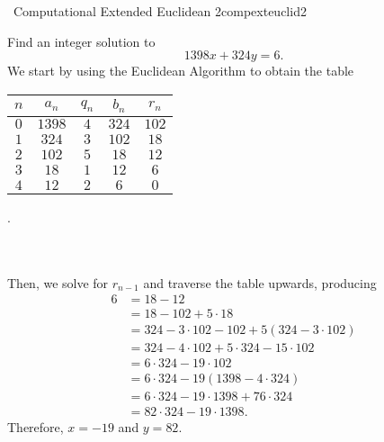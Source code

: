     \begin{exercise}{\Difficulty\,\Difficulty\,\,Computational Extended Euclidean 2}{compexteuclid2}
    
        Find an integer solution to
        \begin{equation*}
            1398x+324y=6.
        \end{equation*}
        We start by using the Euclidean Algorithm to obtain the table
        \begin{center}
            \begin{tabular}{c|c|c|c|c}
                \hline
                \(n\) & \(a_n\) & \(q_n\) & \(b_n\) & \(r_n\) \\
                \hline
                \(0\) & \(1398\) & \(4\) & \(324\) & \(102\) \\
                \(1\) & \(324\) & \(3\) & \(102\) & \(18\) \\
                \(2\) & \(102\) & \(5\) & \(18\) & \(12\) \\
                \(3\) & \(18\) & \(1\) & \(12\) & \(6\) \\
                \(4\) & \(12\) & \(2\) & \(6\) & \(0\) \\
                \hline
            \end{tabular}.
        \end{center}
        \vphantom
        \\
        \\
        Then, we solve for \(r_{n-1}\) and traverse the table upwards, producing
        \begin{align*}
            6&=18-12 \\
            &=18-102+5\cdot18 \\
            &=324-3\cdot102-102+5(324-3\cdot102) \\
            &=324-4\cdot102+5\cdot324-15\cdot102 \\
            &=6\cdot324-19\cdot102 \\
            &=6\cdot324-19(1398-4\cdot324) \\
            &=6\cdot324-19\cdot1398+76\cdot324 \\
            &=82\cdot324-19\cdot1398.
        \end{align*}
        Therefore, \(x=-19\) and \(y=82\).
    
    \end{exercise}
